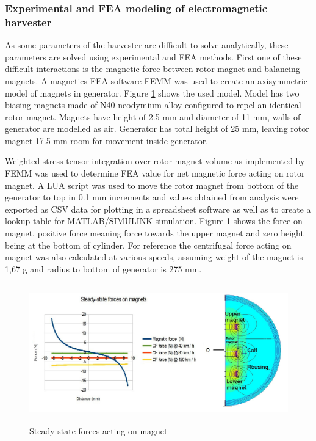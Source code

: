 \subsubsection{Experimental and FEA modeling of electromagnetic harvester}
As some parameters of the harvester are difficult to solve analytically, these parameters are solved using experimental and FEA methods. First one of these difficult interactions is the magnetic force between rotor magnet and balancing magnets. A magnetics FEA software FEMM \cite{Meeker2013} was used to create an axisymmetric model of magnets in generator. Figure \ref{femm_forces} shows the used model. Model has two biasing magnets made of N40-neodymium alloy configured to repel an identical rotor magnet. Magnets have height of 2.5 mm and diameter of 11 mm, walls of generator are modelled as air. Generator has total height of 25 mm, leaving rotor magnet 17.5 mm room for movement inside generator.

Weighted stress tensor integration over rotor magnet volume as implemented by FEMM was used to determine FEA value for net magnetic force acting on rotor magnet. A LUA script was used to move the rotor magnet from bottom of the generator to top in 0.1 mm increments and values obtained from analysis were exported as CSV data for plotting in a spreadsheet software as well as to create a lookup-table for MATLAB/SIMULINK simulation. Figure \ref{femm_forces} shows the force on magnet, positive force meaning force towards the upper magnet and zero height being at the bottom of cylinder. For reference the centrifugal force acting on magnet was also calculated at various speeds, assuming weight of the magnet is 1,67 g and radius to bottom of generator is 275 mm.

\begin{figure}[htb]
  \begin{center}
  \includegraphics[height=6cm]{images/own_dwg/femm_fvsd_dualmagnet.jpg}
  \end{center}
  \caption{\label{femm_forces} Steady-state forces acting on magnet}
\end{figure}

